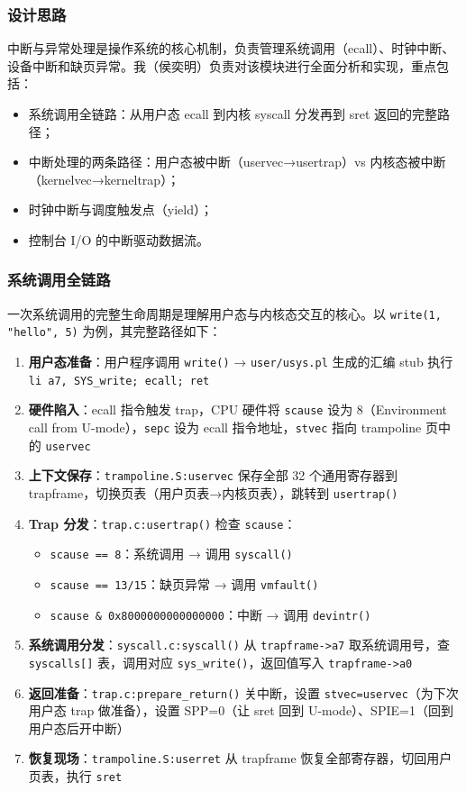 \documentclass[12pt,a4paper]{ctexart}
\begin{document}
\subsubsection{设计思路}

中断与异常处理是操作系统的核心机制，负责管理系统调用（ecall）、时钟中断、设备中断和缺页异常。我（侯奕明）负责对该模块进行全面分析和实现，重点包括：

\begin{itemize}
  \item 系统调用全链路：从用户态 ecall 到内核 syscall 分发再到 sret 返回的完整路径；
  \item 中断处理的两条路径：用户态被中断（uservec→usertrap）vs 内核态被中断（kernelvec→kerneltrap）；
  \item 时钟中断与调度触发点（yield）；
  \item 控制台 I/O 的中断驱动数据流。
\end{itemize}

\subsubsection{系统调用全链路}

一次系统调用的完整生命周期是理解用户态与内核态交互的核心。以 \texttt{write(1, "hello", 5)} 为例，其完整路径如下：

\begin{enumerate}
  \item \textbf{用户态准备}：用户程序调用 \texttt{write()} → \texttt{user/usys.pl} 生成的汇编 stub 执行 \texttt{li a7, SYS\_write; ecall; ret}
  \item \textbf{硬件陷入}：ecall 指令触发 trap，CPU 硬件将 \texttt{scause} 设为 8（Environment call from U-mode），\texttt{sepc} 设为 ecall 指令地址，\texttt{stvec} 指向 trampoline 页中的 \texttt{uservec}
  \item \textbf{上下文保存}：\texttt{trampoline.S:uservec} 保存全部 32 个通用寄存器到 trapframe，切换页表（用户页表→内核页表），跳转到 \texttt{usertrap()}
  \item \textbf{Trap 分发}：\texttt{trap.c:usertrap()} 检查 \texttt{scause}：
    \begin{itemize}
      \item \texttt{scause == 8}：系统调用 → 调用 \texttt{syscall()}
      \item \texttt{scause == 13/15}：缺页异常 → 调用 \texttt{vmfault()}
      \item \texttt{scause \& 0x8000000000000000}：中断 → 调用 \texttt{devintr()}
    \end{itemize}
  \item \textbf{系统调用分发}：\texttt{syscall.c:syscall()} 从 \texttt{trapframe->a7} 取系统调用号，查 \texttt{syscalls[]} 表，调用对应 \texttt{sys\_write()}，返回值写入 \texttt{trapframe->a0}
  \item \textbf{返回准备}：\texttt{trap.c:prepare\_return()} 关中断，设置 \texttt{stvec=uservec}（为下次用户态 trap 做准备），设置 SPP=0（让 sret 回到 U-mode）、SPIE=1（回到用户态后开中断）
  \item \textbf{恢复现场}：\texttt{trampoline.S:userret} 从 trapframe 恢复全部寄存器，切回用户页表，执行 \texttt{sret}
\end{enumerate}
\end{document}
